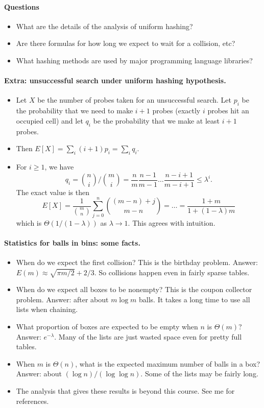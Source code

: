 \paragraph{Questions}
\begin{itemize}
\item What are the details of the analysis of uniform hashing?
\item Are there formulas for how long we expect to wait for a collision, etc?
\item What hashing methods are used by major programming language libraries?
\end{itemize}


\paragraph{Extra: unsuccessful search under uniform hashing hypothesis.}
\begin{itemize}
\item Let $X$ be the number of probes taken for an unsuccessful search. 
Let $p_i$ be the probability that we need to make $i+1$ probes 
(exactly $i$ probes hit an occupied cell) and let $q_i$ be the probability 
that we make at least $i+1$ probes. 
\item Then 
$E[X] = \sum_i (i+1) p_i = \sum_i q_i$.
\item For $i \geq 1$, we have
$$ q_i = \binom{n}{i}/\binom{m}{i} = \frac{n}{m} \frac{n-1}{m-1} 
\dots \frac{n - i + 1}{m - i + 1}  \leq \lambda^i.
$$
The exact value is then
$$
E[X] = \frac{1}{\binom{m}{n}} \sum_{j=0}^n \binom{(m-n)+j}{m-n} = 
\dots = \frac{1+m}{1+(1-\lambda)m}
$$
which is $\Theta(1/(1 - \lambda))$ as $\lambda \to 1$. This agrees with 
intuition.
\end{itemize}

\paragraph{Statistics for balls in bins: some facts.}
\begin{itemize}
\item When do we expect the first collision? This is the 
{birthday problem}. Answer: $E(m) \approx \sqrt{\pi m/2} + 2/3$.
So collisions happen even in fairly sparse tables.
\item When do we expect all boxes to be nonempty? This is the 
{coupon collector problem}. Answer: after about $m \log m$ balls. 
It takes a long time to use all lists when chaining.
\item What proportion of boxes are expected to be empty when $n$ is $\Theta(m)$? 
Answer: $e^{-\lambda}$. Many of the lists are just wasted space even for 
pretty full tables.
\item When $m$ is $\Theta(n)$, what is the expected maximum number of balls in a box? 
Answer: about $(\log n)/(\log \log n)$. Some of the lists may be fairly long. 
\item The analysis that gives these results is beyond this course. See me for 
references.
\end{itemize}

